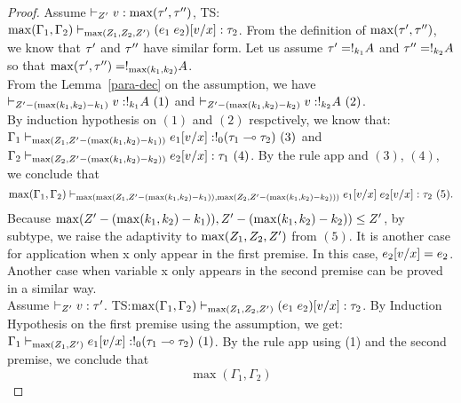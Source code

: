 \documentclass[a4paper,11pt]{article}
\theoremstyle{definition}
\begin{document}
\begin{proof}
{  }
  Assume $\empty \tvdash{\nnatA'} \valr : \max(\type',\type'')$, TS: $\max (\Gamma_1, \Gamma_2 )
  \vdash_{\max(Z_1,Z_2, Z' )} (e_1 \;
  e_2)[v/x]  : \tau_2$. From the definition of $\max(\tau',
  \tau'')$, we know that $\tau'$ and $\tau''$ have similar
  form. Let us assume $\tau'= !_{k_1} A$ and $\tau'' =
  !_{k_2} A$ so that $\max(\tau',\tau'') = !_{\max(k_1,k_2)}
  A$.\\
  From the Lemma~\ref{para-dec} on the assumption, we have $\empty
  \tvdash{\nnatA' - (\max(k_1,k_2)-k_1) } \valr : \bang{k_1}
  \ltype~(1)$ and $\empty
  \tvdash{\nnatA' - (\max(k_1,k_2)-k_2) } \valr : \bang{k_2}
  \ltype~(2)$.\\ By induction hypothesis on $(1)$ and $(2)$ respctively,
  we know that:  $ \Gamma_1  \vdash_{ \max( Z_1, Z' - (\max(k_1,k_2)-k_1) ) } e_1[v/x]:  !_{0} ( \tau_1
  \multimap \tau_2   ) ~(3)$  and $ \Gamma_2  \vdash_{\max(Z_2 ,
    Z' - (\max(k_1,k_2)-k_2)   )} e_2[v/x]: \tau_1 ~(4)$.  By the
  rule app and $(3)$, $(4)$, we conclude that $$\max (\Gamma_1, \Gamma_2 )
  \vdash_{\max(  \max( Z_1, Z' - (\max(k_1,k_2)-k_1) )  , \max(Z_2 ,
    Z' - (\max(k_1,k_2)-k_2)   )  )} e_1[v/x] \;
  e_2[v/x]  : \tau_2 ~(5).$$
  Because $\max(Z' - (\max(k_1,k_2)-k_1) ) , Z' -
  (\max(k_1,k_2)-k_2)   ) \leq Z' $, by subtype, we raise the
  adaptivity to  $\max(Z_1,Z_2, Z' ) $ from $(5)$.
  It is another case for application when x only appear in the first
  premise. In this case, $e_2[v/x] = e_2$. Another case
  when variable x only appears in the second premise can be proved in
  a similar way.\\
  Assume $\empty \tvdash{\nnatA'} \valr :\type'$. TS:$\max (\Gamma_1, \Gamma_2 )
  \vdash_{\max(Z_1,Z_2, Z' )} (e_1 \;
  e_2)[v/x]  : \tau_2$.  By Induction Hypothesis on the first
  premise using the assumption, we get: $\Gamma_1
  \vdash_{\max(Z_1, Z')} e_1[v/x]:  !_{0} ( \tau_1
      \multimap \tau_2  )  ~(1)$. By the rule app using (1) and the second
      premise, we conclude that $$ \max (\Gamma_1, \Gamma_2 )
$$
\end{proof}
\end{document}
